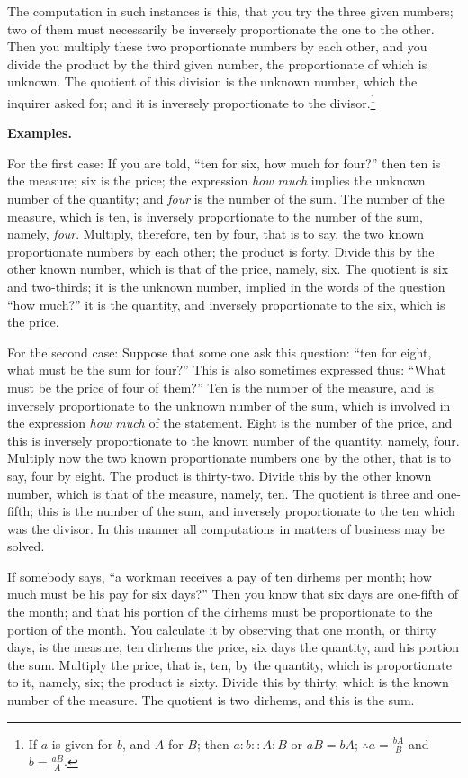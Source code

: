 The computation in such instances is this, that you try the three given numbers; two of them must necessarily be inversely proportionate the one to the other. Then you multiply these two proportionate numbers by each other, and you divide the product by the third given number, the proportionate of which is unknown. The quotient of this division is the unknown number, which the inquirer asked for; and it is inversely proportionate to the divisor.\footnote{If $a$ is given for $b$, and $A$ for $B$; then $a : b :: A : B$ or $aB = bA$; $\therefore a = \frac{bA}{B}$ and $b = \frac{aB}{A}$.}

\vspace{0.3cm}
\noindent\textbf{Examples.}

For the first case: If you are told, ``ten for six, how much for four?'' then ten is the measure; six is the price; the expression \textit{how much} implies the unknown number of the quantity; and \textit{four} is the number of the sum. The number of the measure, which is ten, is inversely proportionate to the number of the sum, namely, \textit{four}. Multiply, therefore, ten by four, that is to say, the two known proportionate numbers by each other; the product is forty. Divide this by the other known number, which is that of the price, namely, six. The quotient is six and two-thirds; it is the unknown number, implied in the words of the question ``how much?'' it is the quantity, and inversely proportionate to the six, which is the price.

For the second case: Suppose that some one ask this question: ``ten for eight, what must be the sum for four?'' This is also sometimes expressed thus: ``What must be the price of four of them?'' Ten is the number of the measure, and is inversely proportionate to the unknown number of the sum, which is involved in the expression \textit{how much} of the statement. Eight is the number of the price, and this is inversely proportionate to the known number of the quantity, namely, four. Multiply now the two known proportionate numbers one by the other, that is to say, four by eight. The product is thirty-two. Divide this by the other known number, which is that of the measure, namely, ten. The quotient is three and one-fifth; this is the number of the sum, and inversely proportionate to the ten which was the divisor. In this manner all computations in matters of business may be solved.

If somebody says, ``a workman receives a pay of ten dirhems per month; how much must be his pay for six days?'' Then you know that six days are one-fifth of the month; and that his portion of the dirhems must be proportionate to the portion of the month. You calculate it by observing that one month, or thirty days, is the measure, ten dirhems the price, six days the quantity, and his portion the sum. Multiply the price, that is, ten, by the quantity, which is proportionate to it, namely, six; the product is sixty. Divide this by thirty, which is the known number of the measure. The quotient is two dirhems, and this is the sum.


